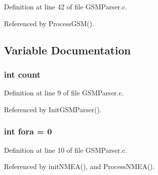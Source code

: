 Definition at line 42 of file GSMParser.c.

Referenced by ProcessGSM().

\subsection{Variable Documentation}
\subsubsection{\setlength{\rightskip}{0pt plus 5cm}int {\bf count}}\label{_g_s_m_parser_8c_d43c3812e6d13e0518d9f8b8f463ffcf}




Definition at line 9 of file GSMParser.c.

Referenced by InitGSMParser().
\subsubsection{\setlength{\rightskip}{0pt plus 5cm}int {\bf fora} = 0}\label{_g_s_m_parser_8c_d3dba34925cf98a5428b085177bc483e}




Definition at line 10 of file GSMParser.c.

Referenced by initNMEA(), and ProcessNMEA().